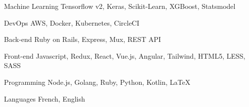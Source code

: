 

\begin{cvskills}

  \cvskill
    {Machine Learning} %
    {Tensorflow v2, Keras, Scikit-Learn, XGBoost, Statsmodel} %

  \cvskill
    {DevOps} %
    {AWS, Docker, Kubernetes, CircleCI} %

  \cvskill
    {Back-end} %
    {Ruby on Rails, Express, Mux, REST API} %

  \cvskill
    {Front-end} %
    {Javascript, Redux, React, Vue.js, Angular, Tailwind, HTML5, LESS, SASS} %

  \cvskill
    {Programming} %
    {Node.js, Golang, Ruby, Python, Kotlin, LaTeX} %

  \cvskill
    {Languages} %
    {French, English} %

\end{cvskills}
